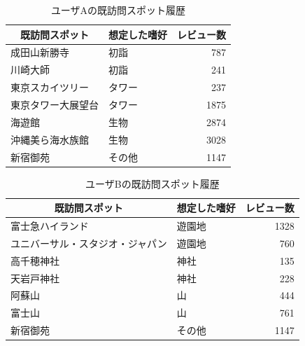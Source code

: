 \documentclass{deimj}
\begin{document}
\begin{table}[t]
    \caption{ユーザAの既訪問スポット履歴}
    \label{table:ユーザAの既訪問スポット履歴}
    \centering
    \begin{tabular}{l|l|r}
    \hline
    \multicolumn{1}{c|}{既訪問スポット} & \multicolumn{1}{c|}{想定した嗜好} & \multicolumn{1}{c}{レビュー数} \\ \hline
    成田山新勝寺                       & 初詣                          & 787                       \\
    川崎大師                         & 初詣                          & 241                       \\
    東京スカイツリー                     & タワー                         & 237                       \\
    東京タワー大展望台                    & タワー                         & 1875                      \\
    海遊館                          & 生物                          & 2874                      \\
    沖縄美ら海水族館                     & 生物                          & 3028                      \\
    新宿御苑                         & その他                         & 1147                      \\ \hline
    \end{tabular}
\end{table}

\begin{table}[t]
    \caption{ユーザBの既訪問スポット履歴}
    \label{table:ユーザBの既訪問スポット履歴}
    \centering
    \begin{tabular}{l|l|r}
    \hline
    \multicolumn{1}{c|}{既訪問スポット} & \multicolumn{1}{c|}{想定した嗜好} & \multicolumn{1}{c}{レビュー数} \\ \hline
    富士急ハイランド                     & 遊園地                         & 1328                      \\
    ユニバーサル・スタジオ・ジャパン             & 遊園地                         & 760                       \\
    高千穂神社                        & 神社                          & 135                       \\
    天岩戸神社                        & 神社                          & 228                       \\
    阿蘇山                          & 山                           & 444                       \\
    富士山                          & 山                           & 761                       \\
    新宿御苑                         & その他                         & 1147                      \\ \hline
    \end{tabular}
\end{table}
\end{document}
